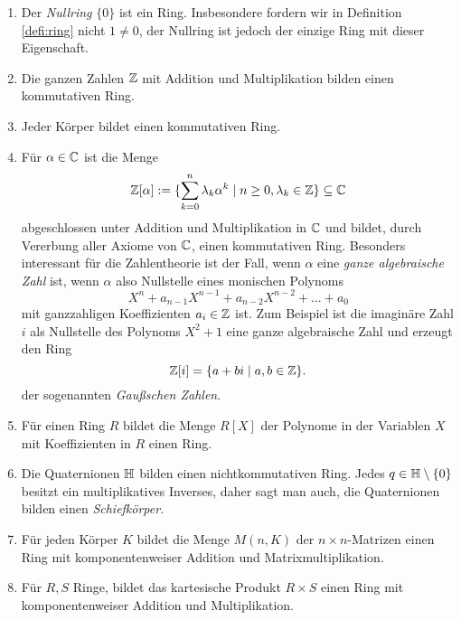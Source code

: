 \documentclass{book}
\begin{document}
\begin{exas}
    \label{exas:ringe}
    \begin{enumerate}
        \item Der \emph{Nullring} $\{0\}$ ist ein Ring. Insbesondere fordern
            wir in Definition \ref{defi:ring} nicht $1 \ne 0$, der Nullring ist
            jedoch der einzige Ring mit dieser Eigenschaft.
        \item Die ganzen Zahlen $\mathbb{Z}$ mit Addition und Multiplikation bilden einen kommutativen Ring. 
        \item Jeder Körper bildet einen kommutativen Ring. 
        \item Für $\alpha \in \mathbb{C}$ ist die Menge 
            \[
                \mathbb{Z}[\alpha] := \{\sum_{k=0}^n \lambda_k \alpha^k \; | \; n \ge 0, \lambda_k \in \mathbb{Z}\} \subseteq \mathbb{C}
            \]
            abgeschlossen unter Addition und Multiplikation in $\mathbb{C}$ und bildet,
            durch Vererbung aller Axiome von $\mathbb{C}$, einen kommutativen Ring.
            Besonders interessant für die Zahlentheorie ist der Fall, wenn
            $\alpha$ eine \emph{ganze algebraische Zahl} ist, wenn $\alpha$
            also Nullstelle eines monischen Polynoms
            \[
                X^n + a_{n-1} X^{n-1} + a_{n-2} X^{n-2} + ... + a_0
            \]
            mit ganzzahligen Koeffizienten $a_i \in \mathbb{Z}$ ist. 
            Zum Beispiel ist die imaginäre Zahl $i$ als Nullstelle des Polynoms
            $X^2 + 1$ eine ganze algebraische Zahl und erzeugt den Ring
            \[
                \mathbb{Z}[i] = \{ a + b i \; | \; a,b \in \mathbb{Z} \}.
            \]
            der sogenannten \emph{Gaußschen Zahlen}.

        \item Für einen Ring $R$ bildet die Menge $R[X]$ der Polynome in der
            Variablen $X$ mit Koeffizienten in $R$ einen Ring.
        \item Die Quaternionen $\mathbb{H}$ bilden einen nichtkommutativen Ring. Jedes $q \in \mathbb{H}
            \setminus \{0\}$ besitzt ein multiplikatives Inverses, daher
            sagt man auch, die Quaternionen bilden einen {\em Schiefkörper}. 
        \item Für jeden Körper $K$ bildet die Menge $M(n,K)$ der $n \times
            n$-Matrizen einen Ring mit komponentenweiser Addition und
            Matrixmultiplikation.
        \item Für $R,S$ Ringe, bildet das kartesische Produkt $R \times S$
            einen Ring mit komponentenweiser Addition und Multiplikation.
    \end{enumerate}
\end{exas}
\end{document}
